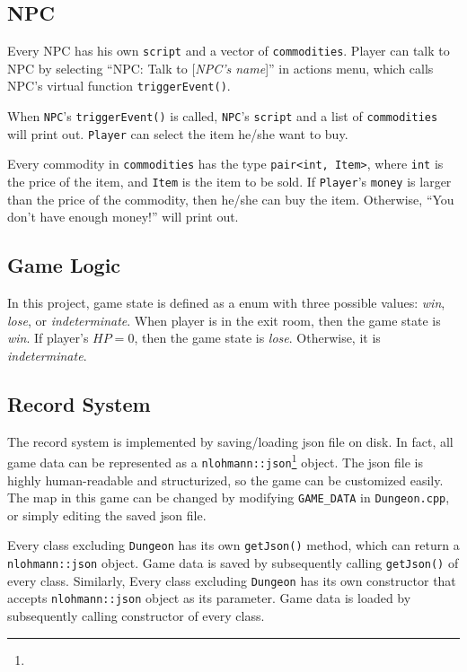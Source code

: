 \documentclass{article}
\begin{document}
    \subsection{NPC}\label{subsection:npc}
    Every NPC has his own \texttt{script} and a vector of \texttt{commodities}. Player can talk to NPC by selecting ``NPC: Talk to [\textit{NPC's name}]'' in actions menu, which calls NPC's virtual function \texttt{triggerEvent()}. 
    \par
    When \texttt{NPC}'s \texttt{triggerEvent()} is called, \texttt{NPC}'s \texttt{script} and a list of \texttt{commodities} will print out. \texttt{Player} can select the item he/she want to buy.
    \par
    Every commodity in \texttt{commodities} has the type \texttt{pair<int, Item>}, where \texttt{int} is the price of the item, and \texttt{Item} is the item to be sold. If \texttt{Player}'s \texttt{money} is larger than the price of the commodity, then he/she can buy the item. Otherwise, ``You don't have enough money!'' will print out.
    
    
    \subsection{Game Logic}
    In this project, game state is defined as a enum with three possible values: \textit{win}, \textit{lose}, or \textit{indeterminate}. When player is in the exit room, then the game state is \textit{win}. If player's $HP = 0$, then the game state is \textit{lose}. Otherwise, it is \textit{indeterminate}.
    
    \subsection{Record System} \label{subsection:record_system}
    The record system is implemented by saving/loading json file on disk. In fact, all game data can be represented as a \texttt{nlohmann::json}\footnote{} object. The json file is highly human-readable and structurized, so the game can be customized easily. The map in this game can be changed by modifying \texttt{GAME\_DATA} in \texttt{Dungeon.cpp}, or simply editing the saved json file.
    \par
    Every class excluding \texttt{Dungeon} has its own \texttt{getJson()} method, which can return a \texttt{nlohmann::json} object. Game data is saved by subsequently calling \texttt{getJson()} of every class. Similarly, Every class excluding \texttt{Dungeon} has its own constructor that accepts \texttt{nlohmann::json} object as its parameter. Game data is loaded by subsequently calling constructor of every class.
    
\end{document}
